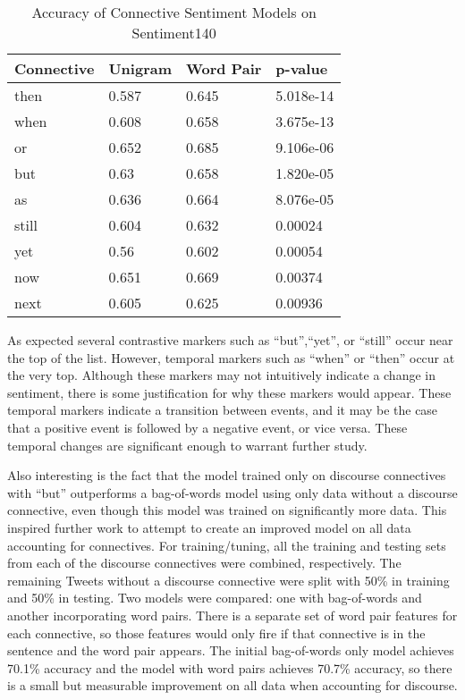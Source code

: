 \documentclass[11pt,letterpaper]{article}
\begin{document}
\begin{table}[h!]
\centering
\begin{tabular}{|l|l|l|l|}
\hline
Connective & Unigram &  Word Pair & p-value\\
\hline
then &  0.587& 0.645 & 5.018e-14 \\
\hline
when &  0.608& 0.658 &3.675e-13\\
\hline
or &  0.652& 0.685 &9.106e-06\\
\hline
but &  0.63& 0.658 &1.820e-05\\
\hline
as &  0.636& 0.664 &8.076e-05\\
\hline
still &  0.604& 0.632 &0.00024\\
\hline
yet &  0.56& 0.602 &0.00054\\
\hline
now &  0.651& 0.669 &0.00374\\
\hline
next &  0.605& 0.625 &0.00936\\
\hline
\end{tabular}
\caption{Accuracy of Connective Sentiment Models on Sentiment140}
\label{table:0}
\end{table}

As expected several contrastive markers such as ``but'',``yet'', or ``still'' occur near the top of the list.
However, temporal markers such as ``when'' or ``then'' occur at the very top.
Although these markers may not intuitively indicate a change in sentiment, there is some justification for
why these markers would appear.  These temporal markers indicate a transition between events, and it may
be the case that a positive event is followed by a negative event, or vice versa.  These temporal
changes are significant enough to warrant further study.

Also interesting is the fact that the model trained only on discourse connectives with ``but'' outperforms 
a bag-of-words model using only data without a discourse connective, even though this model was trained on
significantly more data.  
This inspired further work to attempt to create an improved model on all data accounting
for connectives.  For training/tuning, all the training and testing sets from each of the discourse connectives were combined, respectively.
The remaining Tweets without a discourse connective were split with 50\% in training and 50\% in testing.  Two models were compared:
one with bag-of-words and another incorporating word pairs.  There is a separate set of word pair features for each connective,
so those features would only fire if that connective is in the sentence and the word pair appears.
The initial bag-of-words only model achieves 70.1\% accuracy and the model with word pairs achieves 70.7\% accuracy,
so there is a small but measurable improvement on all data when accounting for discourse.
\end{document}
